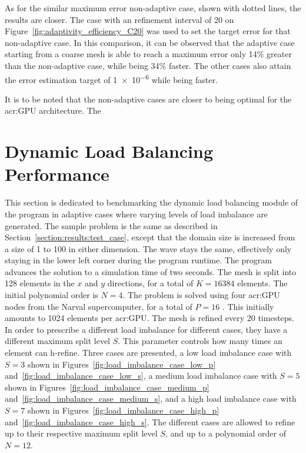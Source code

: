 As for the similar maximum error non-adaptive case, shown with dotted lines, the results are closer.
The case with an refinement interval of 20 on Figure~\ref{fig:adaptivity_efficiency_C20} was used to
set the target error for that non-adaptive case. In this comparison, it can be observed that the
adaptive case starting from a coarse mesh is able to reach a maximum error only 14\% greater than
the non-adaptive case, while being 34\% faster. The other cases also attain the error estimation
target of \num{1e-6} while being faster.

It is to be noted that the non-adaptive cases are closer to being optimal for the \acrshort{acr:GPU}
architecture. The


\section{Dynamic Load Balancing Performance}\label{section:results:load_balancing_performance}

This section is dedicated to benchmarking the dynamic load balancing module of the program in
adaptive cases where varying levels of load imbalance are generated. The sample problem is the same
as described in Section~\ref{section:results:test_case}, except that the domain size is increased
from a size of 1 to 100 in either dimension. The wave stays the same, effectively only staying in
the lower left corner during the program runtime. The program advances the solution to a simulation
time of two seconds. The mesh is split into 128 elements in the \(x\) and \(y\) directions, for a
total of \(K = 16384\) elements. The initial polynomial order is \(N = 4\). The problem is solved
using four \acrshort{acr:GPU} nodes from the Narval supercomputer, for a total of \(P = 16\)
. This initially amounts to 1024 elements per \acrshort{acr:GPU}. The mesh is
refined every 20 timesteps. In order to prescribe a different load imbalance for different cases,
they have a different maximum split level \(S\). This parameter controls how many times an element
can h-refine. Three cases are presented, a low load imbalance case with \(S = 3\) shown in
Figures~\ref{fig:load_imbalance_case_low_p} and~\ref{fig:load_imbalance_case_low_s}, a medium load
imbalance case with \(S = 5\) shown in Figures~\ref{fig:load_imbalance_case_medium_p}
and~\ref{fig:load_imbalance_case_medium_s}, and a high load imbalance case with \(S = 7\) shown in
Figures~\ref{fig:load_imbalance_case_high_p} and~\ref{fig:load_imbalance_case_high_s}. The different
cases are allowed to refine up to their respective maximum split level \(S\), and up to a polynomial
order of \(N = 12\). 

